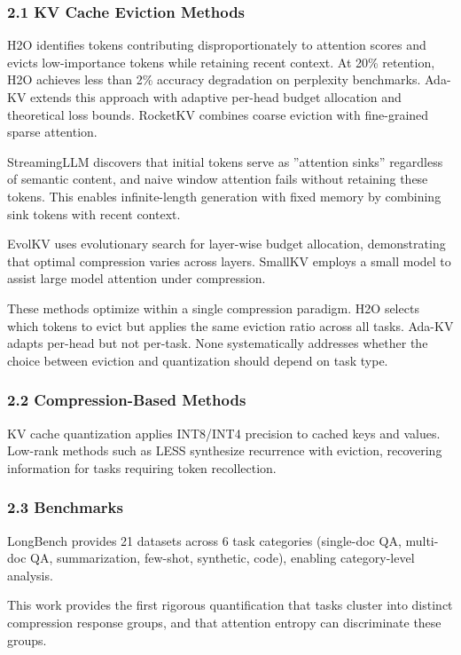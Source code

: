 
\subsubsection{2.1 KV Cache Eviction Methods}

H2O identifies tokens contributing disproportionately to attention scores and evicts low-importance tokens while retaining recent context. At 20\% retention, H2O achieves less than 2\% accuracy degradation on perplexity benchmarks. Ada-KV extends this approach with adaptive per-head budget allocation and theoretical loss bounds. RocketKV combines coarse eviction with fine-grained sparse attention.

StreamingLLM discovers that initial tokens serve as ''attention sinks'' regardless of semantic content, and naive window attention fails without retaining these tokens. This enables infinite-length generation with fixed memory by combining sink tokens with recent context.

EvolKV uses evolutionary search for layer-wise budget allocation, demonstrating that optimal compression varies across layers. SmallKV employs a small model to assist large model attention under compression.

These methods optimize within a single compression paradigm. H2O selects which tokens to evict but applies the same eviction ratio across all tasks. Ada-KV adapts per-head but not per-task. None systematically addresses whether the choice between eviction and quantization should depend on task type.

\subsubsection{2.2 Compression-Based Methods}

KV cache quantization applies INT8/INT4 precision to cached keys and values. Low-rank methods such as LESS synthesize recurrence with eviction, recovering information for tasks requiring token recollection.

\subsubsection{2.3 Benchmarks}

LongBench provides 21 datasets across 6 task categories (single-doc QA, multi-doc QA, summarization, few-shot, synthetic, code), enabling category-level analysis.

This work provides the first rigorous quantification that tasks cluster into distinct compression response groups, and that attention entropy can discriminate these groups.
